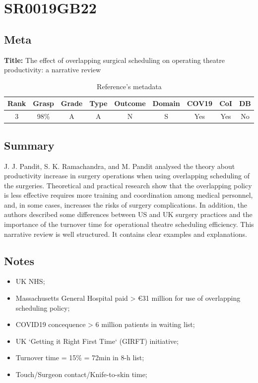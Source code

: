 \section{ SR0019GB22 }


\subsection{Meta}

    \textbf{Title:}
    The effect of overlapping surgical scheduling on operating theatre productivity: a narrative review

    \begin{table}[H]
        \centering
        \begin{tabular}{|c|c|c|c|c|c|c|c|c|}
            \hline
                \textbf{Rank} & \textbf{Grasp} & \textbf{Grade} & \textbf{Type} & \textbf{Outcome} & \textbf{Domain} & \textbf{COV19} & \textbf{CoI} & \textbf{DB} \\
            \hline
                3 & 98\% & A & A & N & S & Yes & Yes & No \\
            \hline
        \end{tabular}
        \caption{Reference's metadata}
        \label{tab:SR0019GB22}
    \end{table}

\subsection{Summary}
    J. J. Pandit, S. K. Ramachandra, and M. Pandit \cite{x333} analysed the theory about productivity increase in surgery operations when using overlapping scheduling of the surgeries. Theoretical and practical research show that the overlapping policy is less effective requires more training and coordination among medical personnel, and, in some cases, increases the risks of surgery complications. In addition, the authors described some differences between US and UK surgery practices and the importance of the turnover time for operational theatre scheduling efficiency. This narrative review is well structured. It contains clear examples and explanations.
    

\subsection{Notes}
    \begin{itemize}
        \item UK NHS;
        \item Massachusetts General Hospital paid > €31 million for use of overlapping scheduling policy;
        \item COVID19 concequence > 6 million patients in waiting list;
        \item UK `Getting it Right First Time` (GIRFT) initiative;
        \item Turnover time = 15\% = 72min in 8-h list;
        \item Touch/Surgeon contact/Knife-to-skin time;
    \end{itemize}


